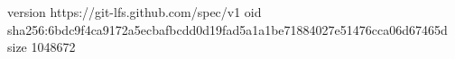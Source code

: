 version https://git-lfs.github.com/spec/v1
oid sha256:6bdc9f4ca9172a5ecbafbcdd0d19fad5a1a1be71884027e51476cca06d67465d
size 1048672
